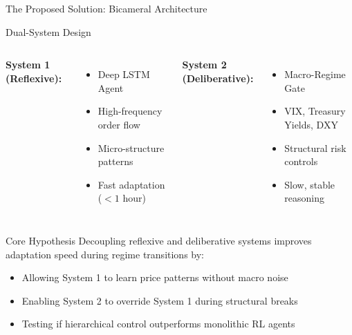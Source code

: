 \documentclass[aspectratio=169]{beamer}
\begin{document}
\begin{frame}{The Proposed Solution: Bicameral Architecture}
\begin{block}{Dual-System Design}
\begin{columns}
\textbf{System 1 (Reflexive):}
\begin{itemize}
    \item Deep LSTM Agent
    \item High-frequency order flow
    \item Micro-structure patterns
    \item Fast adaptation ($< 1$ hour)
\end{itemize}

\textbf{System 2 (Deliberative):}
\begin{itemize}
    \item Macro-Regime Gate
    \item VIX, Treasury Yields, DXY
    \item Structural risk controls
    \item Slow, stable reasoning
\end{itemize}
\end{columns}
\end{block}

\vspace{0.5cm}

\begin{block}{Core Hypothesis}
\alert{Decoupling reflexive and deliberative systems improves adaptation speed during regime transitions} by:
\begin{itemize}
    \item Allowing System 1 to learn price patterns without macro noise
    \item Enabling System 2 to override System 1 during structural breaks
    \item Testing if hierarchical control outperforms monolithic RL agents
\end{itemize}
\end{block}
\end{frame}
\end{document}
